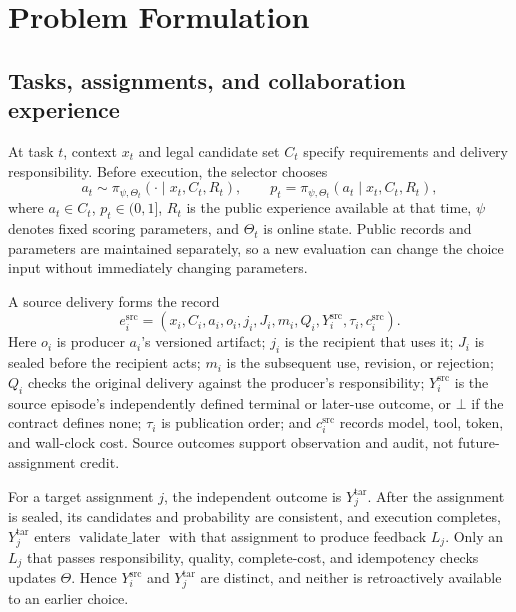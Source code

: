\documentclass[sigconf,anonymous]{aamas}
\begin{document}
\section{Problem Formulation}
\label{sec:problem}
\subsection{Tasks, assignments, and collaboration experience}
At task $t$, context $x_t$ and legal candidate set $C_t$ specify requirements and delivery responsibility. Before execution, the selector chooses
\begin{equation}
 a_t\sim\pi_{\psi,\Theta_t}(\cdot\mid x_t,C_t,R_t),\qquad
 p_t=\pi_{\psi,\Theta_t}(a_t\mid x_t,C_t,R_t),
\label{eq:choice}
\end{equation}
where $a_t\in C_t$, $p_t\in(0,1]$, $R_t$ is the public experience available at that time, $\psi$ denotes fixed scoring parameters, and $\Theta_t$ is online state. Public records and parameters are maintained separately, so a new evaluation can change the choice input without immediately changing parameters.

A source delivery forms the record
\begin{equation}
 e_i^{\mathrm{src}}=(x_i,C_i,a_i,o_i,j_i,J_i,m_i,Q_i,Y_i^{\mathrm{src}},\tau_i,c_i^{\mathrm{src}}).
\label{eq:event}
\end{equation}
Here $o_i$ is producer $a_i$'s versioned artifact; $j_i$ is the recipient that uses it; $J_i$ is sealed before the recipient acts; $m_i$ is the subsequent use, revision, or rejection; $Q_i$ checks the original delivery against the producer's responsibility; $Y_i^{\mathrm{src}}$ is the source episode's independently defined terminal or later-use outcome, or $\bot$ if the contract defines none; $\tau_i$ is publication order; and $c_i^{\mathrm{src}}$ records model, tool, token, and wall-clock cost. Source outcomes support observation and audit, not future-assignment credit.

For a target assignment $j$, the independent outcome is $Y_j^{\mathrm{tar}}$. After the assignment is sealed, its candidates and probability are consistent, and execution completes, $Y_j^{\mathrm{tar}}$ enters $\operatorname{validate\_later}$ with that assignment to produce feedback $L_j$. Only an $L_j$ that passes responsibility, quality, complete-cost, and idempotency checks updates $\Theta$. Hence $Y_i^{\mathrm{src}}$ and $Y_j^{\mathrm{tar}}$ are distinct, and neither is retroactively available to an earlier choice.
\end{document}
